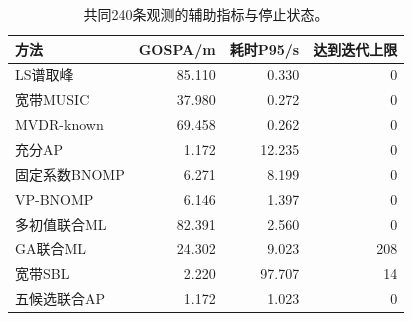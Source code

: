 \begin{table}[H]\centering\small
\caption{共同240条观测的辅助指标与停止状态。}\label{tab:auxiliary}
\begin{tabular}{@{}lrrr@{}}\toprule
方法 & GOSPA/m & 耗时P95/s & 达到迭代上限\\\midrule
LS谱取峰 & 85.110 & 0.330 & 0\\
宽带MUSIC & 37.980 & 0.272 & 0\\
MVDR-known & 69.458 & 0.262 & 0\\
充分AP & 1.172 & 12.235 & 0\\
固定系数BNOMP & 6.271 & 8.199 & 0\\
VP-BNOMP & 6.146 & 1.397 & 0\\
多初值联合ML & 82.391 & 2.560 & 0\\
GA联合ML & 24.302 & 9.023 & 208\\
宽带SBL & 2.220 & 97.707 & 14\\
五候选联合AP & 1.172 & 1.023 & 0\\
\bottomrule\end{tabular}\end{table}
